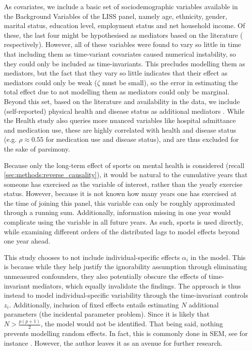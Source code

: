 As covariates, we include a basic set of sociodemographic variables available in the Background Variables of the LISS panel,
namely age, ethnicity, gender, marital status, education level, employment status and net household income.
Of these, the last four might be hypothesised as mediators based on the literature
( respectively).
However, all of these variables were found to vary so little in time that including them as time-variant covariates caused
numerical instability, so they could only be included as time-invariants. This precludes modelling them as mediators,
but the fact that they vary so little indicates that their effect as mediators could only be weak ($\zeta$ must be small),
so the error in estimating the total effect due to not modelling them as mediators could only be marginal.
Beyond this set, based on the literature and availability in the data, we include (self-reported) physical health
and disease status as additional mediators \cite{westcott2012resistance}.
While the Health study also queries more nuanced variables like hospital admittance and medication use, these are
highly correlated with health and disease status (e.g. $\rho \approx 0.55$ for medication use and disease status),
and are thus excluded for the sake of parsimony.

Because only the long-term effect of sports on mental health is considered (recall \cref{sec:methods:reverse_causality}),
it would be natural to the cumulative years that someone has exercised as the variable of interest, rather than the
yearly exercise status. However, because it is not known how many years one has exercised at the time of joining this panel,
this variable can only be roughly approximated through a running sum. Additionally, information missing in one year would
complicate using the variable in all future years.
As such, sports is used directly, while examining different orders of the distributed lags to model effects beyond
one year ahead.

This study chooses to not include individual-specific effects $\alpha_i$ in the model. This is because while they help justify
the ignorability assumption through eliminating unmeasured confounders, they also potentially obscure the effects of time-invariant mediators,
which equally invalidate the findings. The approach is thus instead to model individual-specific variability through the
time-invariant controls $z_i$. Additionally, inclusion of fixed effects entails estimating $N$ additional parameters
(the incidental parameter problem). Since it is likely that $N > \frac{p(p + 1)}{2}$, the model would not be identified.
That being said, nothing prevents modelling random effects. In fact, this is commonly done in
SEM, see for instance . However, the author leaves it as an avenue for further research.


